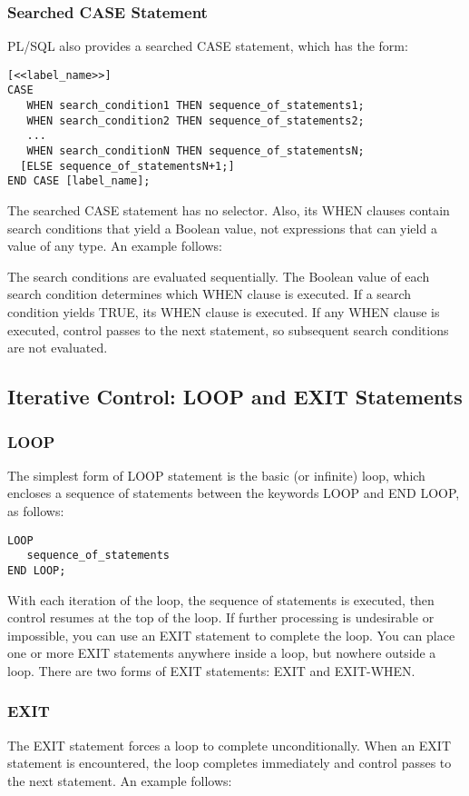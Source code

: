 \subsubsection{Searched CASE Statement}
PL/SQL also provides a searched CASE statement, which has the form:
\begin{verbatim}
[<<label_name>>]
CASE
   WHEN search_condition1 THEN sequence_of_statements1;
   WHEN search_condition2 THEN sequence_of_statements2;
   ...
   WHEN search_conditionN THEN sequence_of_statementsN;
  [ELSE sequence_of_statementsN+1;]
END CASE [label_name];
\end{verbatim}
The searched CASE statement has no selector. Also, its WHEN clauses contain search conditions that yield a Boolean value, not expressions that can yield a value of any type. An example follows:

The search conditions are evaluated sequentially. The Boolean value of each search condition determines which WHEN clause is executed. If a search condition yields TRUE, its WHEN clause is executed. If any WHEN clause is executed, control passes to the next statement, so subsequent search conditions are not evaluated.

\subsection{Iterative Control: LOOP and EXIT Statements}
\subsubsection{LOOP}
The simplest form of LOOP statement is the basic (or infinite) loop, which encloses a sequence of statements between the keywords LOOP and END LOOP, as follows:
\begin{verbatim}
LOOP
   sequence_of_statements
END LOOP;
\end{verbatim}

With each iteration of the loop, the sequence of statements is executed, then control resumes at the top of the loop. If further processing is undesirable or impossible, you can use an EXIT statement to complete the loop. You can place one or more EXIT statements anywhere inside a loop, but nowhere outside a loop. There are two forms of EXIT statements: EXIT and EXIT-WHEN.

\subsubsection{EXIT}
The EXIT statement forces a loop to complete unconditionally. When an EXIT statement is encountered, the loop completes immediately and control passes to the next statement. An example follows:


